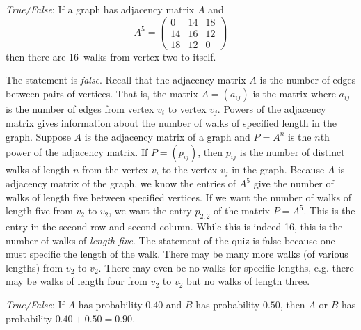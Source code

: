 \documentclass[11pt,letterpaper]{article}
\begin{document}
\quizsol \textit{True/False}: If a graph has adjacency matrix $A$ and 
	\[
	A^5= \begin{pmatrix} 0 & 14 & 18 \\ 14 & 16 & 12 \\ 18 & 12 & 0 \end{pmatrix}
	\]
then there are 16~walks from vertex two to itself. \pspace

\sol The statement is \textit{false}. Recall that the adjacency matrix $A$ is the number of edges between pairs of vertices. That is, the matrix $A= (a_{ij})$ is the matrix where $a_{ij}$ is the number of edges from vertex $v_i$ to vertex $v_j$. Powers of the adjacency matrix gives information about the number of walks of specified length in the graph. Suppose $A$ is the adjacency matrix of a graph and $P= A^n$ is the $n$th power of the adjacency matrix. If $P= (p_{ij})$, then $p_{ij}$ is the number of distinct walks of length $n$ from the vertex $v_i$ to the vertex $v_j$ in the graph. Because $A$ is adjacency matrix of the graph, we know the entries of $A^5$ give the number of walks of length five between specified vertices. If we want the number of walks of length five from $v_2$ to $v_2$, we want the entry $p_{2,2}$ of the matrix $P= A^5$. This is the entry in the second row and second column. While this is indeed 16, this is the number of walks of \textit{length five}. The statement of the quiz is false because one must specific the length of the walk. There may be many more walks (of various lengths) from $v_2$ to $v_2$. There may even be no walks for specific lengths, e.g. there may be walks of length four from $v_2$ to $v_2$ but no walks of length three. \pvspace{1.3cm}



\quizsol \textit{True/False}: If $A$ has probability $0.40$ and $B$ has probability $0.50$, then $A$ or $B$ has probability $0.40 + 0.50= 0.90$. \pspace
\end{document}

